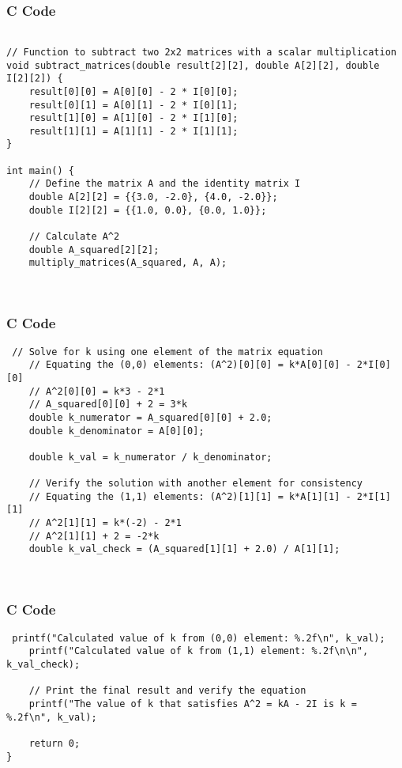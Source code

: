 \documentclass{beamer}
\begin{document}
\begin{frame}[fragile]
    \frametitle{C Code }
    \begin{lstlisting}

// Function to subtract two 2x2 matrices with a scalar multiplication
void subtract_matrices(double result[2][2], double A[2][2], double I[2][2]) {
    result[0][0] = A[0][0] - 2 * I[0][0];
    result[0][1] = A[0][1] - 2 * I[0][1];
    result[1][0] = A[1][0] - 2 * I[1][0];
    result[1][1] = A[1][1] - 2 * I[1][1];
}

int main() {
    // Define the matrix A and the identity matrix I
    double A[2][2] = {{3.0, -2.0}, {4.0, -2.0}};
    double I[2][2] = {{1.0, 0.0}, {0.0, 1.0}};

    // Calculate A^2
    double A_squared[2][2];
    multiply_matrices(A_squared, A, A);

   
    \end{lstlisting}
\end{frame}

\begin{frame}[fragile]
    \frametitle{C Code }
    \begin{lstlisting}
 // Solve for k using one element of the matrix equation
    // Equating the (0,0) elements: (A^2)[0][0] = k*A[0][0] - 2*I[0][0]
    // A^2[0][0] = k*3 - 2*1
    // A_squared[0][0] + 2 = 3*k
    double k_numerator = A_squared[0][0] + 2.0;
    double k_denominator = A[0][0];
    
    double k_val = k_numerator / k_denominator;

    // Verify the solution with another element for consistency
    // Equating the (1,1) elements: (A^2)[1][1] = k*A[1][1] - 2*I[1][1]
    // A^2[1][1] = k*(-2) - 2*1
    // A^2[1][1] + 2 = -2*k
    double k_val_check = (A_squared[1][1] + 2.0) / A[1][1];

   

    \end{lstlisting}
\end{frame}

\begin{frame}[fragile]
    \frametitle{C Code }
    \begin{lstlisting}
 printf("Calculated value of k from (0,0) element: %.2f\n", k_val);
    printf("Calculated value of k from (1,1) element: %.2f\n\n", k_val_check);

    // Print the final result and verify the equation
    printf("The value of k that satisfies A^2 = kA - 2I is k = %.2f\n", k_val);
    
    return 0;
}

    \end{lstlisting}
\end{frame}
\end{document}

